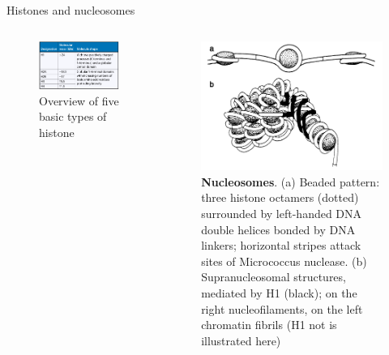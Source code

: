 \documentclass[11pt,ignorenonframetext,aspectratio=169]{beamer}
\begin{document}
\begin{frame}{Histones and nucleosomes}
\protect\hypertarget{histones-and-nucleosomes}{}
\begin{columns}[T,onlytextwidth]
  
  
\begin{figure}
\includegraphics[width=0.65\linewidth]{../images/histone_types} \caption{Overview of five basic types of histone}\label{fig:histone-types}
\end{figure}


\begin{figure}
\includegraphics[width=0.8\linewidth]{../images/nucleosome_structure} \caption{\textbf{Nucleosomes}. (a) Beaded pattern: three histone octamers (dotted) surrounded by left-handed DNA double helices bonded by DNA linkers; horizontal stripes attack sites of Micrococcus nuclease. (b) Supranucleosomal structures, mediated by H1 (black); on the right nucleofilaments, on the left chromatin fibrils (H1 not is illustrated here)}\label{fig:nucleosome-structure}
\end{figure}

\end{columns}
\end{frame}
\end{document}
